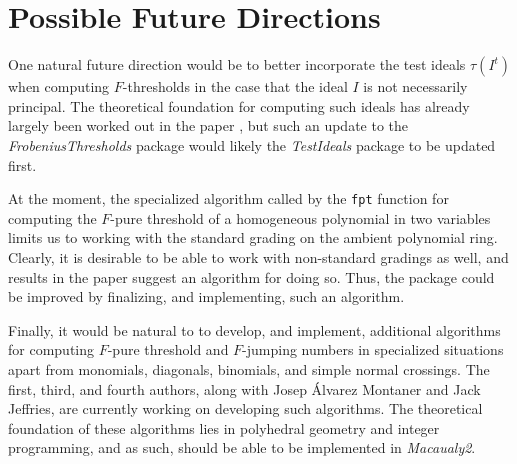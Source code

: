 \documentclass{amsart}
\begin{document}






\section{Possible Future Directions}
\label{sec.FutureDirections}

One natural future direction would be to better incorporate the test ideals $\tau(I^t)$ when computing $F$-thresholds in the case that the ideal $I$ is not necessarily principal.  The theoretical foundation for computing such ideals has already largely been worked out in the paper \cite{SchwedeTuckerTestIdealsOfNonPrincipal}, but such an update to the \emph{FrobeniusThresholds} package would likely the 
\emph{TestIdeals} package to be updated first.

At the moment, the specialized algorithm called by the {\tt fpt} function for computing the $F$-pure threshold of a homogeneous polynomial in two variables limits us to working with the standard grading on the ambient polynomial ring.  Clearly, it is desirable to be able to work with non-standard gradings as well, and results in the paper \cite{HernandezTeixeiraFThresholdFunctions} suggest an algorithm for doing so.  Thus, the package could be improved by finalizing, and implementing, such an algorithm.

Finally, it would be natural to to develop, and implement,  additional algorithms for computing $F$-pure threshold and $F$-jumping numbers in specialized situations apart from monomials, diagonals, binomials, and simple normal crossings.  The first, third, and fourth authors, along with Josep \'Alvarez Montaner and Jack Jeffries,  are currently working on developing such algorithms.  The theoretical foundation of these algorithms lies in polyhedral geometry and integer programming, and as such, should be able to be implemented in \emph{Macaualy2}.  




\end{document}
